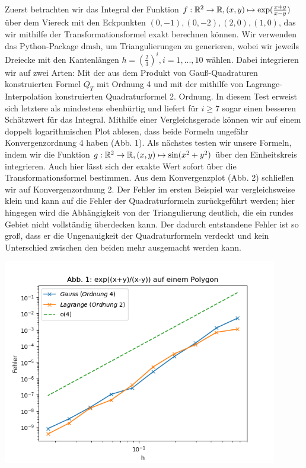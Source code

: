 Zuerst betrachten wir das Integral der Funktion $f: \mathbb{R}^2 \rightarrow \mathbb{R}, (x, y) \mapsto \mathrm{exp}(\frac{x+y}{x-y})$ über dem Viereck mit den Eckpunkten $(0, -1), (0, -2), (2, 0), (1, 0)$, das wir mithilfe der Transformationsformel exakt berechnen können. Wir verwenden das Python-Package $\mathrm{dmsh}$, um Triangulierungen zu generieren, wobei wir jeweils Dreiecke mit den Kantenlängen $h = (\frac{2}{3})^i, i = 1, ..., 10$ wählen. Dabei integrieren wir auf zwei Arten: Mit der aus dem Produkt von Gauß-Quadraturen konstruierten Formel $Q_{T}$ mit Ordnung 4 und mit der mithilfe von Lagrange-Interpolation konstruierten Quadraturformel 2. Ordnung. In diesem Test erweist sich letztere als mindestens ebenbürtig und liefert für $i \ge 7$ sogar einen besseren Schätzwert für das Integral. Mithilfe einer Vergleichsgerade können wir auf einem doppelt logarithmischen Plot ablesen, dass beide Formeln ungefähr Konvergenzordnung 4 haben (Abb. 1).
\newline \newline
Als nächstes testen wir unsere Formeln, indem wir die Funktion $g: \mathbb{R}^2 \rightarrow \mathbb{R}, (x, y) \mapsto \mathrm{sin}(x^2+y^2)$ über den Einheitskreis integrieren. Auch hier lässt sich der exakte Wert sofort über die Transformationsformel bestimmen. Aus dem Konvergenzplot (Abb. 2) schließen wir auf Konvergenzordnung 2. Der Fehler im ersten Beispiel war vergleichsweise klein und kann auf die Fehler der Quadraturformeln zurückgeführt werden; hier hingegen wird die Abhängigkeit von der Triangulierung deutlich, die ein rundes Gebiet nicht vollständig überdecken kann. Der dadurch entstandene Fehler ist so groß, dass er die Ungenauigkeit der Quadraturformeln verdeckt und kein Unterschied zwischen den beiden mehr ausgemacht werden kann.

\begin{center}
\includegraphics[width=120mm]{Aufgabe_3/Abb1.png}
\end{center}

